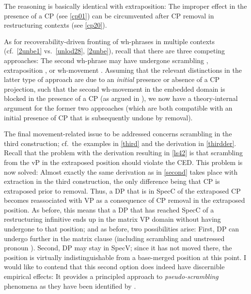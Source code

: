 \documentclass[output=paper]{langsci/langscibook}
\begin{document}
The reasoning is basically identical with extraposition: The improper 
effect in the presence of a CP (see \eqref{cp01}) can be circumvented after CP
removal in restructuring contexts (see \eqref{cp20}).

As for recoverability-driven fronting of wh-phrases in multiple 
contexts (cf.\ \eqref{2unbe1} vs.\ \eqref{unlod28}, \eqref{2unbe}), recall that
there are three competing approaches: The second wh-phrase may have undergone
scrambling \parencite{Sauerland:99:loc}, extraposition
\parencite{Lasnik:14:mul}, or wh-movement \parencite{Heck&Mueller:03:vers}.
Assuming that the relevant distinctions in the latter type of approach are due
to an {\it initial} presence or absence of a CP projection, such that the
second wh-movement in the embedded domain is blocked in the presence of a CP
(as argued in \citealt{Heck&Mueller:03:vers}), we now have a theory-internal
argument for the former two approaches (which are both compatible with an
initial presence of CP that is subsequently undone by removal).

The final movement-related issue to be addressed concerns scrambling in the
third construction; cf.\ the examples in \eqref{third} and the derivation in
\eqref{thirdder}. Recall that the problem with the derivation resulting in
\eqref{ls42} is that scrambling from the vP in the extraposed position
should violate the \gls{CED}.  This problem is now solved: Almost exactly the
same derivation as in \eqref{second} takes place with extraction in the third
construction, the only difference being that CP is extraposed prior to removal.
Thus, a DP that is in SpecC of the extraposed CP becomes reassociated with VP
as a consequence of CP removal in the extraposed position. As before, this
means that a DP that has reached SpecC of a restructuring infinitive ends up in
the matrix VP domain without having undergone  to that position; and as
before, two possibilities arise:  First, DP can undergo further  in the
matrix clause (including scrambling and unstressed pronoun ). Second,
DP may stay in SpecV; since it has not moved there, the position is virtually
indistinguishable from a base-merged position at this point. I would like to
contend that this second option does indeed have discernible empirical effects:
It  provides a principled approach to {\it pseudo-scrambling} phenomena as they
have been identified by \cite{Geilfuss:91}.
\end{document}
